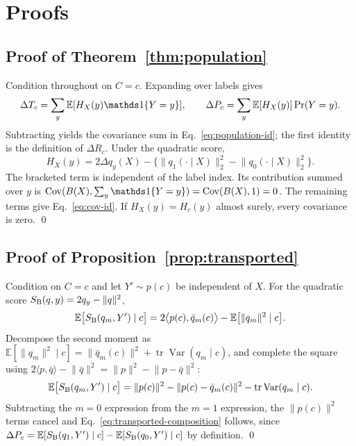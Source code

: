\section{Proofs}\label{app:proofs}

\subsection{Proof of Theorem~\ref{thm:population}}
Condition throughout on $C=c$. Expanding over labels gives
\[
\Delta T_c=\sum_y\mathbb E[H_X(y)\ind \{Y=y\}],\qquad
\Delta P_c=\sum_y\mathbb E[H_X(y)]\Pr(Y=y).
\]
Subtracting yields the covariance sum in Eq.~\eqref{eq:population-id}; the first
identity is the definition of $\Delta R_c$. Under the quadratic score,
\[
H_X(y)=2\Delta q_y(X)-\{\lVert q_1(\cdot\mid X)\rVert_2^2-
\lVert q_0(\cdot\mid X)\rVert_2^2\}.
\]
The bracketed term is independent of the label index. Its contribution summed over $y$
is $\operatorname{Cov}(B(X),\sum_y\ind \{Y=y\})=
\operatorname{Cov}(B(X),1)=0$. The remaining terms give Eq.~\eqref{eq:cov-id}. If
$H_X(y)=H_c(y)$ almost surely, every covariance is zero. \qed

\subsection{Proof of Proposition~\ref{prop:transported}}
Condition on $C=c$ and let $Y'\sim p(c)$ be independent of $X$. For the quadratic score
$S_{\rm B}(q,y)=2q_y-\lVert q\rVert^2$,
\begin{equation}
\mathbb E\bigl[S_{\rm B}(q_m,Y')\mid c\bigr]
=2\bigl\langle p(c),\bar q_m(c)\bigr\rangle-\mathbb E\bigl[\lVert q_m\rVert^2\mid c\bigr].
\end{equation}
Decompose the second moment as
$\mathbb E[\lVert q_m\rVert^2\mid c]=\lVert\bar q_m(c)\rVert^2
+\operatorname{tr}\operatorname{Var}(q_m\mid c)$, and complete the square using
$2\langle p,\bar q\rangle-\lVert\bar q\rVert^2=\lVert p\rVert^2-\lVert p-\bar q\rVert^2$:
\begin{equation}
\mathbb E\bigl[S_{\rm B}(q_m,Y')\mid c\bigr]
=\lVert p(c)\rVert^2-\lVert p(c)-\bar q_m(c)\rVert^2
-\operatorname{tr}\operatorname{Var}(q_m\mid c).
\end{equation}
Subtracting the $m=0$ expression from the $m=1$ expression, the $\lVert p(c)\rVert^2$
terms cancel and Eq.~\eqref{eq:transported-composition} follows, since
$\Delta P_c=\mathbb E[S_{\rm B}(q_1,Y')\mid c]-\mathbb E[S_{\rm B}(q_0,Y')\mid c]$ by
definition. \qed

